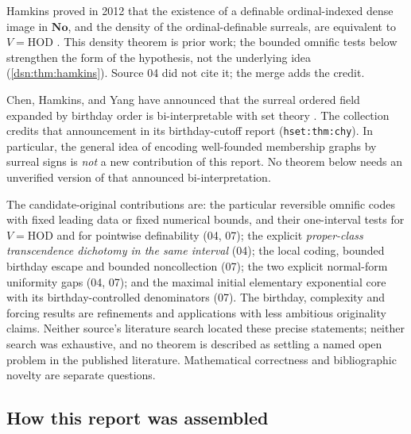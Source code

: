 \documentclass[11pt,a4paper]{article}
\numberwithin{equation}{section}
\theoremstyle{definition}
\theoremstyle{remark}
\newcommand{\No}{\mathbf{No}}
\newcommand{\HOD}{\mathrm{HOD}}
\newcommand{\lbl}[1]{\nolinkurl{#1}}
\begin{document}
Hamkins proved in 2012 that the existence of a definable
ordinal-indexed dense image in $\No$, and the density of the
ordinal-definable surreals, are equivalent to $V=\HOD$
\cite{HamkinsDensity}. This density theorem is prior work; the bounded
omnific tests below strengthen the form of the hypothesis, not the
underlying idea (\cref{dsn:thm:hamkins}). Source 04 did not cite it; the
merge adds the credit.

Chen, Hamkins, and Yang have announced that the surreal ordered field
expanded by birthday order is bi-interpretable with set theory
\cite{CHY}. The collection credits that announcement in its birthday-cutoff
report (\lbl{hset:thm:chy}). In particular, the general idea of encoding
well-founded membership graphs by surreal signs is \emph{not} a new
contribution of this report. No theorem below needs an unverified version
of that announced bi-interpretation.

The candidate-original contributions are: the particular reversible
omnific codes with fixed leading data or fixed numerical bounds, and their
one-interval tests for $V=\HOD$ and for pointwise definability (04, 07);
the explicit \emph{proper-class transcendence dichotomy in the same
interval} (04); the local coding, bounded birthday escape and bounded
noncollection (07); the two explicit normal-form uniformity gaps (04,
07); and the maximal initial elementary exponential core with its
birthday-controlled denominators (07). The birthday, complexity and
forcing results are refinements and applications with less ambitious
originality claims. Neither source's literature search located these
precise statements; neither search was exhaustive, and no theorem is
described as settling a named open problem in the published literature.
Mathematical correctness and bibliographic novelty are separate questions.

\subsection{How this report was assembled}\label{dsn:sub:provenance}
\end{document}
